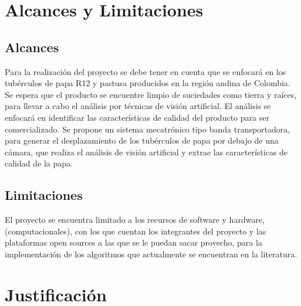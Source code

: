 \section{Alcances y Limitaciones}

\subsection{Alcances}

Para la realización del proyecto se debe tener en cuenta que se enfocará en los tubérculos de papa R12 y pastusa producidos en la región andina de Colombia. Se espera que el producto se encuentre limpio de suciedades como tierra y raíces, para llevar a cabo el análisis por técnicas de visión artificial. El análisis se enfocará en identificar las características de calidad del producto para ser comercializado. Se propone un sistema mecatrónico tipo banda transportadora, para generar el desplazamiento de los tubérculos de papa por debajo de una cámara, que realiza el análisis de visión artificial y extrae las características de calidad de la papa.  

\subsection{Limitaciones}


El proyecto se encuentra limitado a los recursos de software y hardware, (computacionales), con los que cuentan los integrantes del proyecto y las plataformas open sources a las que se le puedan sacar provecho, para la implementación de los algoritmos que actualmente se encuentran en la literatura.

\section{Justificación}

